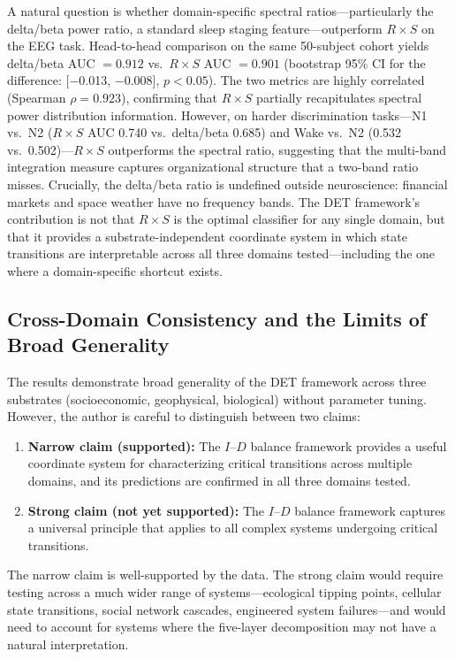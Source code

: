 \documentclass[aip,cha,reprint,amsmath,amssymb]{revtex4-2}
\begin{document}
A natural question is whether domain-specific spectral ratios---particularly the delta/beta power ratio, a standard sleep staging feature---outperform $R \times S$ on the EEG task. Head-to-head comparison on the same 50-subject cohort yields delta/beta AUC $= 0.912$ vs.\ $R \times S$ AUC $= 0.901$ (bootstrap 95\% CI for the difference: [$-$0.013, $-$0.008], $p < 0.05$). The two metrics are highly correlated (Spearman $\rho = 0.923$), confirming that $R \times S$ partially recapitulates spectral power distribution information. However, on harder discrimination tasks---N1 vs.\ N2 ($R \times S$ AUC 0.740 vs.\ delta/beta 0.685) and Wake vs.\ N2 (0.532 vs.\ 0.502)---$R \times S$ outperforms the spectral ratio, suggesting that the multi-band integration measure captures organizational structure that a two-band ratio misses. Crucially, the delta/beta ratio is undefined outside neuroscience: financial markets and space weather have no frequency bands. The DET framework's contribution is not that $R \times S$ is the optimal classifier for any single domain, but that it provides a substrate-independent coordinate system in which state transitions are interpretable across all three domains tested---including the one where a domain-specific shortcut exists.

\subsection{Cross-Domain Consistency and the Limits of Broad Generality}

The results demonstrate broad generality of the DET framework across three substrates (socioeconomic, geophysical, biological) without parameter tuning. However, the author is careful to distinguish between two claims:

\begin{enumerate}
\item \textbf{Narrow claim (supported):} The $I$--$D$ balance framework provides a useful coordinate system for characterizing critical transitions across multiple domains, and its predictions are confirmed in all three domains tested.
\item \textbf{Strong claim (not yet supported):} The $I$--$D$ balance framework captures a universal principle that applies to all complex systems undergoing critical transitions.
\end{enumerate}

The narrow claim is well-supported by the data. The strong claim would require testing across a much wider range of systems---ecological tipping points, cellular state transitions, social network cascades, engineered system failures---and would need to account for systems where the five-layer decomposition may not have a natural interpretation.
\end{document}
